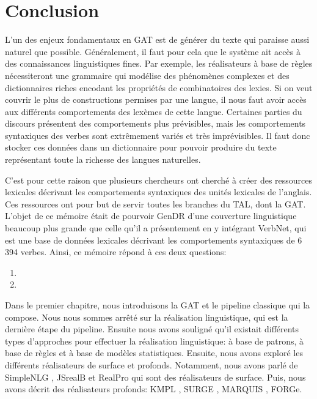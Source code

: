
\chapter*{Conclusion}
L'un des enjeux fondamentaux en \ac{GAT} est de générer du texte qui paraisse aussi naturel que possible. Généralement, il faut pour cela que le système ait accès à des connaissances linguistiques fines. Par exemple, les réalisateurs à base de règles nécessiteront une grammaire qui modélise des phénomènes complexes et des dictionnaires riches encodant les propriétés de combinatoires des lexies. Si on veut couvrir le plus de constructions permises par une langue, il nous faut avoir accès aux différents comportements des lexèmes de cette langue. Certaines parties du discours présentent des comportements plus prévisibles, mais les comportements syntaxiques des verbes sont extrêmement variés et très imprévisibles. Il faut donc stocker ces données dans un dictionnaire pour pouvoir produire du texte représentant toute la richesse des langues naturelles.

C'est pour cette raison que plusieurs chercheurs ont cherché à créer des ressources lexicales décrivant les comportements syntaxiques des unités lexicales de l'anglais. Ces ressources ont pour but de servir toutes les branches du \ac{TAL}, dont la \ac{GAT}. L'objet de ce mémoire était de pourvoir GenDR d'une couverture linguistique beaucoup plus grande que celle qu'il a présentement en y intégrant VerbNet, qui est une base de données lexicales décrivant les comportements syntaxiques de 6\,394 verbes. Ainsi, ce mémoire répond à ces deux questions:

\begin{enumerate}
  \item {}
  \item {}
\end{enumerate}

Dans le premier chapitre, nous introduisons la \ac{GAT} et le pipeline classique qui la compose. Nous nous sommes arrêté sur la réalisation linguistique, qui est la dernière étape du pipeline. Ensuite nous avons souligné qu'il existait différents types d'approches pour effectuer la réalisation linguistique: à base de patrons, à base de règles et à base de modèles statistiques. Ensuite, nous avons exploré les différents réalisateurs de surface et profonds. Notamment, nous avons parlé de SimpleNLG \citep{GattSimpleNLGRealisationEngine2009}, JSrealB \citep{MolinsJSrealBBilingualText2015} et RealPro \citep{LavoieFastPortableRealizer1997} qui sont des réalisateurs de surface. Puis, nous avons décrit des réalisateurs profonds: KMPL \cite{BatemanEnablingTechnologyMultilingual1997}, SURGE \citep{Elhadad98surge:a}, MARQUIS \citep{WannerMARQUISGENERATIONUSERTAILORED2010}, FORGe\citep{MilledemoFORGePompeu2017}.

